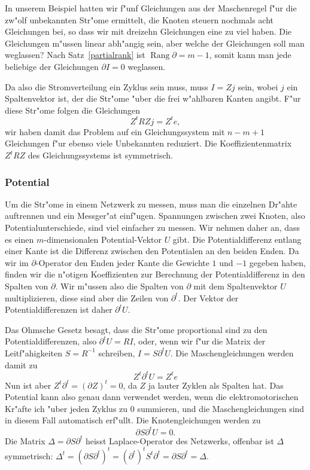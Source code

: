 In unserem Beispiel hatten wir f"unf Gleichungen aus der Maschenregel
f"ur die zw"olf unbekannten Str"ome ermittelt, die Knoten steuern
nochmals acht Gleichungen bei, so dass wir mit dreizehn Gleichungen
eine zu viel haben. Die Gleichungen m"ussen linear abh"angig sein,
aber welche der Gleichungen soll man weglassen?
Nach Satz~\ref{partialrank} ist $\operatorname{Rang}\partial=m-1$,
somit kann man jede beliebige der Gleichungen $\partial I=0$ weglassen.

Da also die Stromverteilung ein Zyklus sein muss, muss $I=Zj$ sein, wobei
$j$ ein Spaltenvektor ist, der die Str"ome "uber die frei w"ahlbaren
Kanten angibt. F"ur diese Str"ome folgen die Gleichungen
\[
Z^tRZj=Z^te,
\]
wir haben damit das Problem auf ein Gleichungssystem mit $n-m+1$
Gleichungen f"ur ebenso viele Unbekannten reduziert.
Die Koeffizientenmatrix $Z^tRZ$ des Gleichungssystems ist symmetrisch.

\subsubsection{Potential}
Um die Str"ome in einem Netzwerk zu messen, muss man die einzelnen
Dr"ahte auftrennen und ein Messger"at einf"ugen.
Spannungen zwischen zwei Knoten, also Potentialunterschiede,
sind viel einfacher zu messen.
Wir nehmen daher an, dass es einen $m$-dimensionalen
Potential-Vektor $U$ gibt.
Die Potentialdifferenz entlang einer Kante ist die Differenz
zwischen den Potentialen an den beiden Enden.
Da wir im $\partial$-Operator den Enden jeder Kante die Gewichte
$1$ und $-1$ gegeben haben, finden wir die n"otigen Koeffizienten
zur Berechnung der Potentialdifferenz in den Spalten von $\partial$.
Wir m"ussen also die Spalten von $\partial$ mit dem Spaltenvektor $U$
multiplizieren, diese sind aber die Zeilen von $\partial^t$.
Der Vektor der Potentialdifferenzen ist daher $\partial^t U$.

Das Ohmsche Gesetz besagt, dass die Str"ome proportional sind zu
den Potentialdifferenzen, also $\partial^t U=RI$, oder, wenn
wir f"ur die Matrix der Leitf"ahigkeiten $S=R^{-1}$ schreiben,
$I=S\partial^t U$. Die Maschengleichungen werden damit zu
\[
Z^t\partial^t U=Z^te
\]
Nun ist aber $Z^t\partial^t=(\partial Z)^t=0$, da $Z$ ja lauter
Zyklen als Spalten hat. Das Potential kann also genau dann verwendet
werden, wenn die elektromotorischen Kr"afte ich "uber jeden Zyklus zu $0$
summieren, und die
Maschengleichungen sind in diesem Fall automatisch erf"ullt.
Die Knotengleichungen werden zu
\[
\partial S\partial^tU=0.
\]
Die Matrix $\Delta = \partial S\partial ^t$ heisst Laplace-Operator des
Netzwerks, offenbar ist $\Delta$ symmetrisch:
$\Delta^t=(\partial S\partial^t)^t
         =(\partial^t)^tS^t\partial^t
         =\partial S\partial^t
         =\Delta$.

